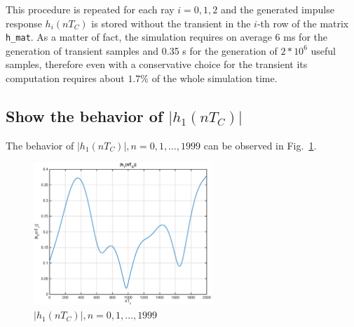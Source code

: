\documentclass[10pt]{article}
\begin{document}
This procedure is repeated for each ray $i = 0, 1, 2$ and the generated impulse response $h_i(nT_C)$ is stored without the transient in the $i$-th row of the matrix \texttt{h\_mat}. As a matter of fact, the simulation requires on average 6 ms for the generation of transient samples and 0.35 s for the generation of $2*10^6$ useful samples, therefore even with a conservative choice for the transient its computation requires about $1.7\%$ of the whole simulation time.


\subsection*{Show the behavior of $|h_1(nT_C)|$}
The behavior of $|h_1(nT_C)|, n = 0, 1, \dots, 1999$ can be observed in Fig.~\ref{fig:h1}.

\begin{figure}[h!]
  \centering
  \includegraphics[width = 0.6\textwidth]{p01_h1}
  \caption{$|h_1(nT_C)|, n = 0, 1, \dots, 1999$}
  \label{fig:h1}
\end{figure}
\end{document}
